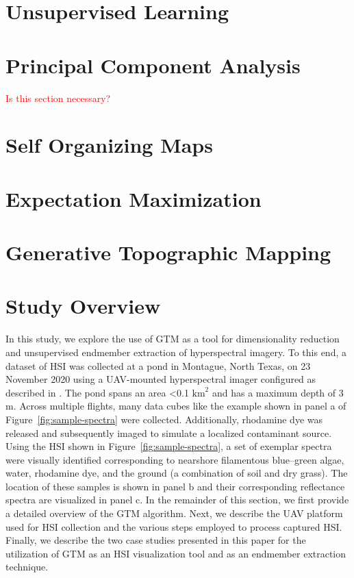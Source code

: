 \section{Unsupervised Learning}

\section{Principal Component Analysis}

\textcolor{red}{Is this section necessary?}

\section{Self Organizing Maps}

\section{Expectation Maximization}

\section{Generative Topographic Mapping}


\section{Study Overview}


In this study, we explore the use of  GTM as a tool for dimensionality reduction and unsupervised endmember extraction of hyperspectral imagery. To this end, a dataset of HSI was collected at a pond in Montague, North Texas, on 23 November 2020 using a UAV-mounted hyperspectral imager configured as described in \cite{robot-team-1, robot-team-2}. The pond spans an area <0.1 $\text{km}^2$ and has a maximum depth of $3$ m. Across multiple flights, many data cubes like the example shown in panel a of Figure~\ref{fig:sample-spectra} were collected. Additionally, rhodamine dye was released and subsequently imaged to simulate a localized contaminant source. Using the HSI shown in Figure~\ref{fig:sample-spectra}, a set of exemplar spectra were visually identified corresponding to nearshore filamentous blue--green algae, water, rhodamine dye, and the ground (a combination of soil and dry grass). The location of these samples is shown in panel b and their corresponding reflectance spectra are visualized in panel c.  In the remainder of this section, we first provide a detailed overview of the GTM algorithm. Next, we describe the UAV platform used for HSI collection and the various steps employed to process captured HSI. Finally, we describe the two case studies presented in this paper for the utilization of  GTM as an HSI visualization tool and as an endmember extraction technique.


